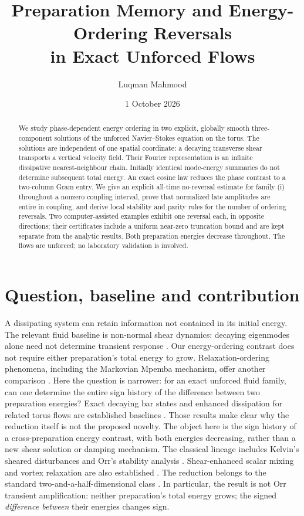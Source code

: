 \documentclass[11pt]{article}
\title{Preparation Memory and Energy-Ordering Reversals\\
in Exact Unforced Flows}
\author{Luqman Mahmood}
\date{1 October 2026}
\begin{document}
\maketitle
{}
\begin{abstract}
We study phase-dependent energy ordering in two explicit, globally smooth
three-component solutions of the unforced Navier--Stokes equation on the torus.
The solutions are independent of one spatial coordinate: a decaying transverse
shear transports a vertical velocity field. Their Fourier representation is
an infinite dissipative nearest-neighbour chain. Initially identical
mode-energy summaries do not determine subsequent total energy. An exact
cosine law reduces the phase contrast to a two-column Gram entry. We give
an explicit all-time no-reversal estimate for family (i) throughout a nonzero
coupling interval, prove that normalized late amplitudes are entire in coupling, and
derive local stability and parity rules for the number of ordering reversals.
Two computer-assisted examples exhibit one reversal each, in opposite
directions; their certificates include a uniform near-zero truncation bound
and are kept separate from the analytic results. Both preparation energies
decrease throughout. The flows are unforced; no laboratory validation is
involved.
\end{abstract}

\section{Question, baseline and contribution}
A dissipating system can retain information not contained in its initial
energy. The relevant fluid baseline is non-normal shear dynamics: decaying
eigenmodes alone need not determine transient response \cite{Trefethen}.
Our energy-ordering contrast does not require either preparation's total
energy to grow. Relaxation-ordering phenomena, including the Markovian
Mpemba mechanism, offer another comparison \cite{LuRaz}. Here the question
is narrower: for an exact unforced fluid family, can one determine the entire
sign history of the difference between two preparation energies?
Exact decaying bar states and enhanced dissipation for related torus flows
are established baselines \cite{BeckWayne,WeiZhangZhao}. Those results make
clear why the reduction itself is not the proposed novelty. The object here
is the sign history of a cross-preparation energy contrast, with both
energies decreasing, rather than a new shear solution or damping mechanism.
The classical lineage includes Kelvin's sheared disturbances and Orr's
stability analysis \cite{Kelvin,Orr}. Shear-enhanced scalar mixing and
vortex relaxation are also established \cite{RhinesYoung,BernoffLingevitch}.
The reduction belongs to the standard two-and-a-half-dimensional class
\cite{MajdaBertozzi}. In particular, the result is not Orr transient
amplification: neither preparation's total energy grows; the signed
\emph{difference between} their energies changes sign.
\end{document}
